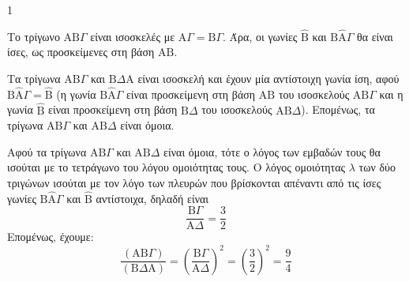 \begin{ylh}{1}
    \item [ΛΥΣΗ]
\end{ylh}
\begin{figure}
\end{figure}
\begin{alist}
\item Το τρίγωνο $\text{AB}\Gamma$ είναι ισοσκελές με $\text{A}\Gamma = \text{B}\Gamma$. Άρα, οι γωνίες $\widehat{\text{B}}$ και $\text{B}\widehat{\text{A}}\Gamma$ θα είναι ίσες, ως προσκείμενες στη βάση $\text{AB}$.
\item Τα τρίγωνα $\text{AB}\Gamma$ και $\text{B}\Delta\text{A}$ είναι ισοσκελή και έχουν μία αντίστοιχη γωνία ίση, αφού $\text{B}\widehat{\text{A}}\Gamma = \widehat{\text{B}}$ (η γωνία $\text{B}\widehat{\text{A}}\Gamma$ είναι προσκείμενη στη βάση $\text{AB}$ του ισοσκελούς $\text{AB}\Gamma$ και η γωνία $\widehat{\text{B}}$ είναι προσκείμενη στη βάση $\text{B}\Delta$ του ισοσκελούς $\text{AB}\Delta$).
Επομένως, τα τρίγωνα $\text{AB}\Gamma$ και $\text{AB}\Delta$ είναι όμοια.
\item Αφού τα τρίγωνα $\text{AB}\Gamma$ και $\text{AB}\Delta$ είναι όμοια, τότε ο λόγος των εμβαδών τους θα ισούται με το τετράγωνο του λόγου ομοιότητας τους. Ο λόγος ομοιότητας $\lambda$ των δύο τριγώνων ισούται με τον λόγο των πλευρών που βρίσκονται απέναντι από τις ίσες γωνίες $\text{B}\widehat{\text{A}}\Gamma$ και $\widehat{\text{B}}$ αντίστοιχα, δηλαδή είναι
\[ \frac{\text{B}\Gamma}{\text{A}\Delta} = \frac{3}{2} \]
Επομένως, έχουμε:
\[ \frac{(\text{AB}\Gamma)}{(\text{B}\Delta\text{A})} = \left(\frac{\text{B}\Gamma}{\text{A}\Delta}\right)^2 = \left(\frac{3}{2}\right)^2 = \frac{9}{4} \]
\end{alist}